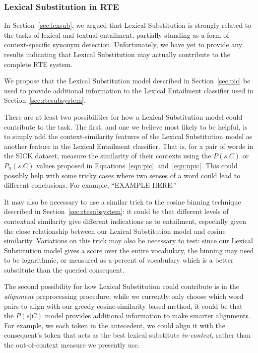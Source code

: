 \documentclass[12pt]{article}
\begin{document}
\subsubsection{Lexical Substitution in RTE}

In Section~\ref{sec:lexsub}, we argued that Lexical Substitution is strongly
related to the tasks of lexical and textual entailment, partially standing
as a form of context-specific synonym detection. Unfortunately, we have
yet to provide any results indicating that Lexical Substitution may actually
contribute to the complete RTE system.

We propose that the Lexical Substitution model described in
Section~\ref{sec:pic} be used to provide additional information to
the Lexical Entailment classifier used in Section~\ref{sec:rtesubsystem}.

There are at least two possibilities for how a Lexical Substitution model could
contribute to the task. The first, and one we believe most likely to be
helpful, is to simply add the context-similarity features of the Lexical
Substitution model as another feature in the Lexical Entailment classifier.
That is, for a pair of words in the SICK dataset, measure the similarity of
their contexts using the $P(s|C)$ or $P_n(s|C)$ values proposed in
Equations~\ref{eqn:pic}~and~\ref{eqn:npic}. This could possibly help
with some tricky cases where two senses of a word could lead to different conclusions.
For example, ``EXAMPLE HERE.''

It may also be necessary to use a similar trick to the cosine binning technique
described in Section~\ref{sec:rtesubsystem}: it could be that different levels
of contextual similarity give different indications as to entailment, especially
given the close relationship between our Lexical Substitution model and
cosine similarity. Variations on this trick may also be necessary to test:
since our Lexical Substitution model gives a score over the entire vocabulary,
the binning may need to be logarithmic, or measured as a percent of vocabulary
which is a better substitute than the queried consequent.

The second possibility for how Lexical Substitution could contribute is in
the {\em alignment} preprocessing procedure: while we currently only choose
which word pairs to align with our greedy cosine-similarity based method, it
could be that the $P(s|C)$ model provides additional information to make
smarter alignments. For example, we each token in the antecedent, we could
align it with the consequent's token that acts as the best lexical substitute
{\em in-context}, rather than the out-of-context measure we presently use.
\end{document}
